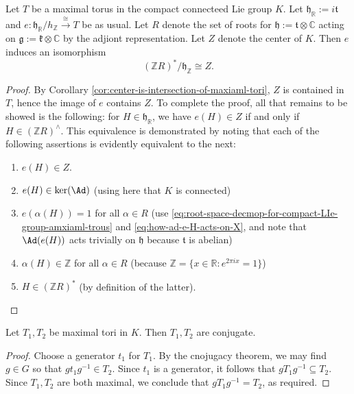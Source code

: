 \documentclass[reqno]{amsart} 
\begin{document}
\begin{theorem}
  Let $T$ be a maximal torus in the compact connecteed Lie group $K$.  Let $\mathfrak{h}_\mathbb{R} := i \mathfrak{t}$ and $e : \mathfrak{h}_\mathbb{R}/h_\mathbb{Z} \xrightarrow{\cong }T$ be as usual.  Let $R$ denote the set of roots for $\mathfrak{h} := \mathfrak{t} \otimes \mathbb{C}$ acting on $\mathfrak{g} := \mathfrak{k} \otimes \mathbb{C}$ by the adjiont representation.  Let $Z$ denote the center of $K$.  Then $e$ induces an isomorphism
  \begin{equation*}
    (\mathbb{Z} R)^* /\mathfrak{h}_\mathbb{Z} \cong Z.
  \end{equation*}
\end{theorem}
\begin{proof}
  By Corollary \ref{cor:center-is-intersection-of-maxiaml-tori}, $Z$ is contained in $T$, hence the image of $e$ contains $Z$.  To complete the proof, all that remains to be showed is the following: for $H \in \mathfrak{h}_\mathbb{R}$, we have $e(H) \in Z$ if and only if $H \in (\mathbb{Z} R)^\wedge$.  This equivalence is demonstrated by noting that each of the following assertions is evidently equivalent to the next:
  \begin{enumerate}
  \item $e(H) \in Z$.
  \item $e(H) \in \ker(\Ad)$ (using here that $K$ is connected)
  \item $e(\alpha(H)) = 1$ for all $\alpha \in R$ (use \eqref{eq:root-space-decmop-for-compact-LIe-group-amxiaml-trous} and \eqref{eq:how-ad-e-H-acts-on-X}, and note that $\Ad(e(H))$ acts trivially on $\mathfrak{h}$ because $\mathfrak{t}$ is abelian)
  \item $\alpha(H) \in \mathbb{Z}$ for all $\alpha \in R$ (because $\mathbb{Z} = \{x \in \mathbb{R} : e^{2 \pi i x} = 1\}$)
  \item $H \in (\mathbb{Z} R)^*$ (by definition of the latter).
  \end{enumerate}
\end{proof}

\begin{lemma}
  Let $T_1, T_2$ be maximal tori in $K$.  Then $T_1,T_2$ are conjugate.
\end{lemma}
\begin{proof}
  Choose a generator $t_1$ for $T_1$.  By the cnojugacy theorem, we may find $g \in G$ so that $g t_1 g^{-1} \in T_2$.  Since $t_1$ is a generator, it follows that $g T_1 g^{-1} \subseteq T_2$.  Since $T_1,T_2$ are both maximal, we conclude that $g T_1 g^{-1} = T_2$, as required.
\end{proof}
\end{document}
